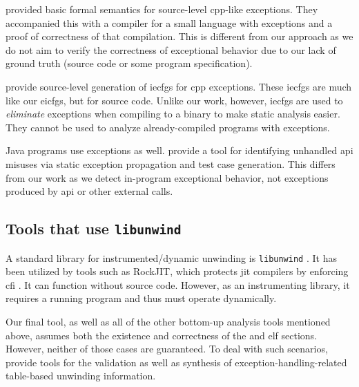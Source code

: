 \Textcite{hutton2004compiling} provided basic formal semantics for source-level \gls{cpp}-like exceptions.
They accompanied this with a compiler for a small language with exceptions and a proof of correctness of that compilation.
This is different from our approach as we do not aim to verify the correctness of exceptional behavior due to our lack of ground truth (source code or some program specification).

\Textcite{prabhu2011interprocedural} provide source-level generation of \acp{iecfg} for \gls{cpp} exceptions.
These \acp{iecfg} are much like our \acp{eicfg}, but for source code.
Unlike our work, however, \acp{iecfg} are used to \emph{eliminate} exceptions when compiling to a binary to make static analysis easier.
They cannot be used to analyze already-compiled programs with exceptions.

Java programs use exceptions as well. \Textcite{kechagia2019misuse} provide a tool for identifying unhandled \ac{api} misuses via static exception propagation and test case generation. This differs from our work as we detect in-program exceptional behavior, not exceptions produced by \ac{api} or other external calls.

\subsection{Tools that use \texttt{libunwind}}
A standard library for instrumented/dynamic unwinding is \lstinline|libunwind| \autocite{libunwind}.
It has been utilized by tools such as RockJIT, which protects \ac{jit} compilers by enforcing \ac{cfi} \autocite{niu2014rockjit}.
It can function without source code. However, as an instrumenting library, it requires a running program and thus must operate dynamically.

Our final tool, as well as all of the other bottom-up analysis tools mentioned above, assumes both the existence and correctness of the  and  \ac{elf} sections.
However, neither of those cases are guaranteed.
To deal with such scenarios, \textcite{bastian2019dwarf} provide tools for the validation as well as synthesis of exception-handling-related table-based unwinding information.

%
%
%
%

